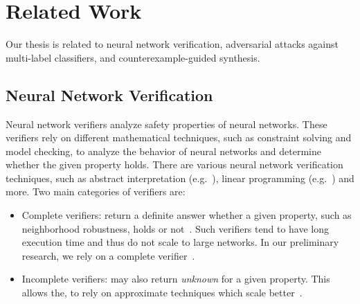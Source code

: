 
\section{Related Work}
Our thesis is related to neural network verification, adversarial attacks against multi-label classifiers, and counterexample-guided synthesis.

\subsection{Neural Network Verification}
Neural network verifiers analyze safety properties of neural networks.
These verifiers rely on different mathematical techniques, such as constraint solving and model checking, to analyze the behavior of neural networks and determine whether the given property holds.
There are various neural network verification techniques, such as abstract interpretation (e.g.~\cite{ABSTRACTINTER, INCOMPLETE1}), linear programming (e.g.~\cite{MIPVERIFY}) and more.
Two main categories of verifiers are:
\begin{itemize}
    \item Complete verifiers: return a definite answer whether a given property, such as neighborhood robustness, holds or not~\cite{MIPVERIFY, COMPLETE}. Such verifiers tend to have long execution time and thus do not scale to large networks.
        In our preliminary research, we rely on a complete verifier~\cite{MIPVERIFY}.
    \item Incomplete verifiers: may also return \emph{unknown} for a given property. This allows the, to rely on approximate techniques which scale better~\cite{INCOMPLETE1, INCOMPLETE2}.
\end{itemize}

